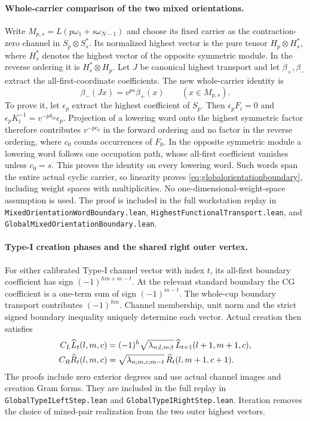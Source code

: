 \documentclass[10pt,a4paper]{article}
\newcommand{\lean}[1]{{\small\nolinkurl{#1}}}
\newenvironment{revision}{\begingroup}{\endgroup}
\begin{document}
\begin{revision}
\paragraph{Whole-carrier comparison of the two mixed orientations.}
Write $M_{p,s}=L(p\omega _1+s\omega _{N-1})$ and choose its fixed
carrier as the contraction-zero channel in $S_p\otimes S_s^*$.
Its normalized highest vector is the pure tensor $H_p\otimes H_s^*$,
where $H_s^*$ denotes the highest vector of the opposite symmetric module.
In the reverse ordering it is $H_s^*\otimes H_p$. Let $J$ be canonical highest transport and let
$\beta_+,\beta_-$ extract the all-first-coordinate coefficients.
The new whole-carrier identity is
\begin{equation}\label{eq:globalorientationboundary}
 \beta_-(Jx)=v^{ps}\beta_+(x)\qquad(x\in M_{p,s}).
\end{equation}
To prove it, let $\epsilon_p$ extract the highest coefficient of $S_p$.
Then $\epsilon_pF_i=0$ and
$\epsilon_pK_i^{-1}=v^{-p\delta_{i0}}\epsilon_p$.
Projection of a lowering word onto the highest symmetric factor
therefore contributes $v^{-p c_0}$ in the forward ordering and no
factor in the reverse ordering, where $c_0$ counts occurrences of $F_0$.
In the opposite symmetric module a lowering word follows one occupation
path, whose all-first coefficient vanishes unless $c_0=s$.
This proves the identity on every lowering word. Such words span the
entire actual cyclic carrier, so linearity proves
\eqref{eq:globalorientationboundary}, including weight spaces with
multiplicities. No one-dimensional-weight-space assumption is used.
The proof is included in the full workstation replay in
\lean{MixedOrientationWordBoundary.lean},
\lean{HighestFunctionalTransport.lean}, and
\lean{GlobalMixedOrientationBoundary.lean}.

\paragraph{Type-I creation phases and the shared right outer vertex.}
For either calibrated Type-I channel vector with index $t$, its
all-first boundary coefficient has sign $(-1)^{hm+m-t}$.
At the relevant standard boundary the CG coefficient is a one-term sum
of sign $(-1)^{m-t}$. The whole-cup boundary transport contributes
$(-1)^{hm}$. Channel membership, unit norm and the strict signed
boundary inequality uniquely determine each vector. Actual creation
then satisfies
\begin{align}
 C_L\widehat L_t(l,m,c)
   &=(-1)^h\sqrt{\lambda_{n;l,m;t}}\,
       \widehat L_{t+1}(l+1,m+1,c),\notag\\
 C_R\widehat R_t(l,m,c)
   &=\sqrt{\lambda_{n;m,c;m-t}}\,
       \widehat R_t(l,m+1,c+1).
 \label{eq:globalIsteps}
\end{align}
The proofs include zero exterior degrees and use actual channel images
and creation Gram forms. They are included in the full replay in
\lean{GlobalTypeILeftStep.lean} and
\lean{GlobalTypeIRightStep.lean}. Iteration removes the choice of
mixed-pair realization from the two outer highest vectors.


\end{revision}
\end{document}
